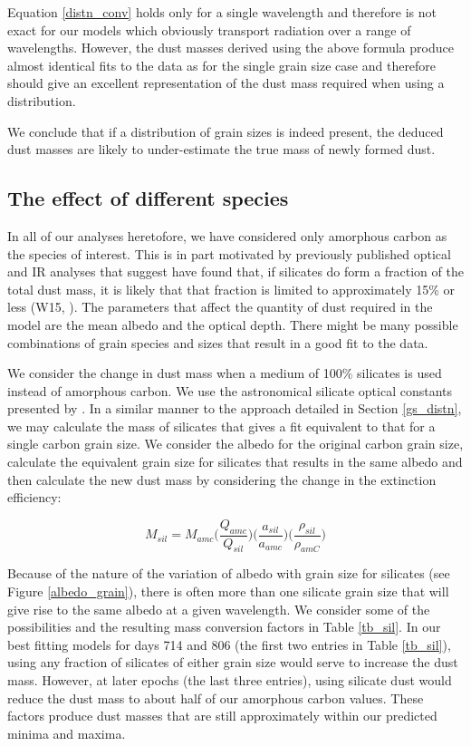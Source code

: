 \documentclass[useAMS,usenatbib,usegraphicx]{mnras}
\begin{document}
Equation \ref{distn_conv} holds only for a single wavelength and therefore is not exact for our models which obviously transport radiation over a range of wavelengths.  However, the dust masses derived using the above formula produce almost identical fits to the data as for the single grain size case and therefore should give an excellent representation of the dust mass required when using a distribution.

We  conclude that if a distribution of grain sizes is indeed present, the deduced dust masses are likely to  under-estimate the true mass of newly formed dust.

\subsection{The effect of different species}

In all of our analyses heretofore, we have considered only amorphous carbon as the species of interest.  This is in part motivated by previously published optical and IR analyses that suggest have found that, if silicates do form a fraction of the total dust mass, it is likely that that fraction is limited to approximately 15\% or less (W15, \citet{Ercolano2007}).  The parameters that affect the quantity of dust required in the model are the mean albedo and the optical depth.  There might be many possible combinations of grain species and sizes that result in a good fit to the data.  

We consider the change in dust mass when a medium of 100\% silicates is used instead of amorphous carbon.  We use the astronomical silicate optical constants presented by \cite{Draine1984}.  In a similar manner to the approach detailed in Section \ref{gs_distn}, we may calculate the mass of silicates that gives a fit equivalent to that for a single carbon grain size.  We consider the albedo for the original carbon grain size, calculate the equivalent grain size for silicates that results in the same albedo and then calculate the new dust mass by considering the change in the extinction efficiency:

\begin{equation}
M_{sil} = M_{amc} \Big( \frac{Q_{amc}}{Q_{sil}} \Big) \Big(\frac{a_{sil}}{a_{amc}}\Big) \Big(\frac{\rho_{sil}}{\rho_{amC}}\Big)
\end{equation}

Because of the nature of the variation of albedo with grain size for silicates (see Figure \ref{albedo_grain}), there is often more than one silicate grain size that will give rise to the same albedo at a given wavelength.  We consider some of the possibilities and the resulting mass conversion factors in Table \ref{tb_sil}.  In our best fitting models for days 714 and 806 (the first two entries in Table \ref{tb_sil}), using any fraction of silicates of either grain size would serve to increase the dust mass.  However, at later epochs (the last three entries), using silicate dust would reduce the dust mass to about half of our amorphous carbon values. These factors produce dust masses that are still approximately within our predicted minima and maxima.
\end{document}
